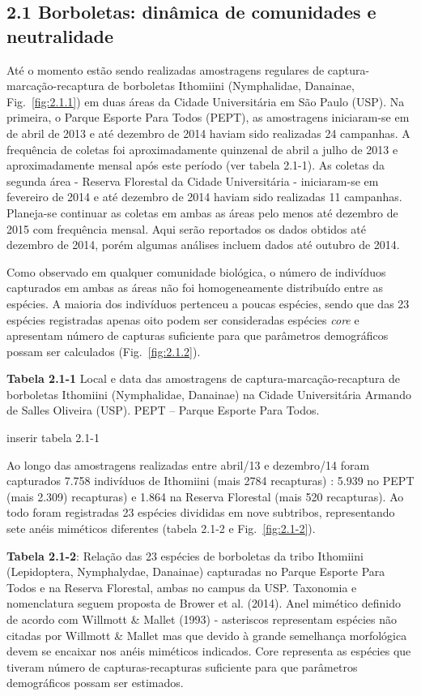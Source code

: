 \subsection{2.1 Borboletas: dinâmica de comunidades e neutralidade} %
\label{sec:dinamica-temporal-borb} 
Até o momento estão sendo realizadas amostragens regulares de
captura-marcação-recaptura de borboletas Ithomiini (Nymphalidae,
Danainae, Fig.~\ref{fig:2.1.1}) 
em duas áreas da Cidade Universitária em São Paulo (USP). Na
primeira, o Parque Esporte Para Todos (PEPT), as amostragens
iniciaram-se em de abril de 2013 e até dezembro de 2014 haviam sido
realizadas 24 campanhas. A frequência de coletas foi aproximadamente
quinzenal de abril a julho de 2013 e aproximadamente mensal após este
período (ver tabela 2.1-1). As coletas da segunda área - Reserva
Florestal da Cidade Universitária - iniciaram-se em fevereiro de 2014
e até dezembro de 2014 haviam sido realizadas 11 campanhas. Planeja-se
continuar as coletas em ambas as áreas pelo menos até dezembro de 2015
com frequência mensal. Aqui serão reportados os dados obtidos até
dezembro de 2014, porém algumas análises incluem dados até outubro de 2014.

Como observado em qualquer comunidade biológica, o número de
indivíduos capturados em ambas as áreas não foi homogeneamente
distribuído entre as espécies. A maioria dos indivíduos pertenceu a
poucas espécies, sendo que das 23 espécies registradas apenas oito
podem ser consideradas espécies \emph{core} e apresentam número de capturas
suficiente para que parâmetros demográficos possam ser calculados
(Fig.~\ref{fig:2.1.2}). 

\textbf{Tabela 2.1-1} Local e data das amostragens de
captura-marcação-recaptura de borboletas Ithomiini (Nymphalidae,
Danainae) na Cidade Universitária Armando de Salles Oliveira
(USP). PEPT – Parque Esporte Para Todos.

inserir tabela 2.1-1



Ao longo das amostragens realizadas entre abril/13 e dezembro/14 foram
capturados 7.758 indivíduos de Ithomiini (mais 2784 recapturas) : 5.939 no PEPT (mais 2.309) recapturas) e 1.864 na Reserva Florestal (mais 520 recapturas). Ao todo foram registradas 23 espécies divididas em nove subtribos, representando sete anéis miméticos diferentes (tabela 2.1-2 e Fig.~\ref{fig:2.1-2}).

\textbf{Tabela 2.1-2}: Relação das 23 espécies de borboletas da tribo
Ithomiini (Lepidoptera, Nymphalydae, Danainae) capturadas no Parque
Esporte Para Todos e na Reserva Florestal, ambas no campus da
USP. Taxonomia e nomenclatura seguem proposta de Brower et
al. (2014). Anel mimético definido de acordo com Willmott \& Mallet
(1993) - asteriscos representam espécies não citadas por Willmott \&
Mallet mas que devido à grande semelhança morfológica devem se
encaixar nos anéis miméticos indicados. Core representa as espécies
que tiveram número de capturas-recapturas suficiente para que
parâmetros demográficos possam ser estimados.